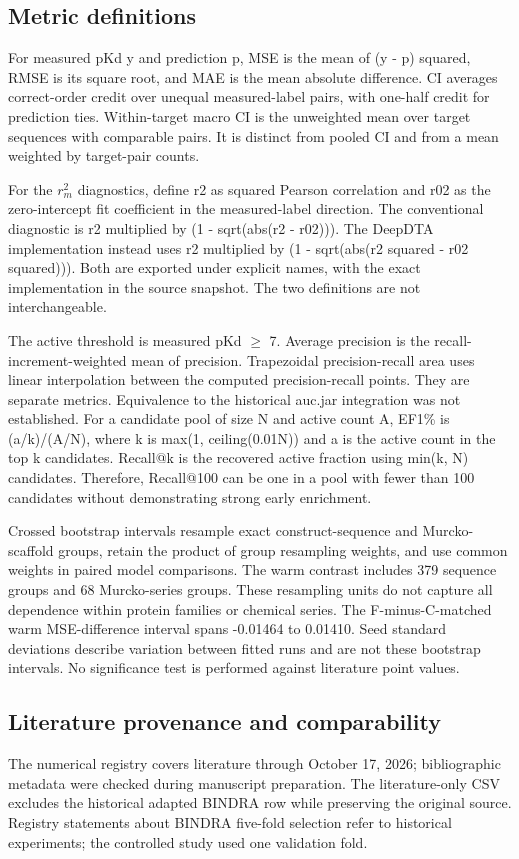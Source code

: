 \documentclass[12pt,a4paper]{article}
\begin{document}
\subsection*{Metric definitions}
For measured pKd y and prediction p, MSE is the mean of (y - p) squared, RMSE is its square root, and MAE is the mean absolute difference. CI averages correct-order credit over unequal measured-label pairs, with one-half credit for prediction ties. Within-target macro CI is the unweighted mean over target sequences with comparable pairs. It is distinct from pooled CI and from a mean weighted by target-pair counts.

For the \(r_m^2\) diagnostics, define r2 as squared Pearson correlation and r02 as the zero-intercept fit coefficient in the measured-label direction. The conventional diagnostic is r2 multiplied by (1 - sqrt(abs(r2 - r02))). The DeepDTA implementation instead uses r2 multiplied by (1 - sqrt(abs(r2 squared - r02 squared))). Both are exported under explicit names, with the exact implementation in the source snapshot. The two definitions are not interchangeable.

The active threshold is measured pKd \(\geq\) 7. Average precision is the recall-increment-weighted mean of precision. Trapezoidal precision-recall area uses linear interpolation between the computed precision-recall points. They are separate metrics. Equivalence to the historical auc.jar integration was not established. For a candidate pool of size N and active count A, EF1\% is (a/k)/(A/N), where k is max(1, ceiling(0.01N)) and a is the active count in the top k candidates. Recall@k is the recovered active fraction using min(k, N) candidates. Therefore, Recall@100 can be one in a pool with fewer than 100 candidates without demonstrating strong early enrichment.

Crossed bootstrap intervals resample exact construct-sequence and Murcko-scaffold groups, retain the product of group resampling weights, and use common weights in paired model comparisons. The warm contrast includes 379 sequence groups and 68 Murcko-series groups. These resampling units do not capture all dependence within protein families or chemical series. The F-minus-C-matched warm MSE-difference interval spans -0.01464 to 0.01410. Seed standard deviations describe variation between fitted runs and are not these bootstrap intervals. No significance test is performed against literature point values.

\subsection*{Literature provenance and comparability}
The numerical registry covers literature through October 17, 2026; bibliographic metadata were checked during manuscript preparation. The literature-only CSV excludes the historical adapted BINDRA row while preserving the original source. Registry statements about BINDRA five-fold selection refer to historical experiments; the controlled study used one validation fold.
\end{document}
